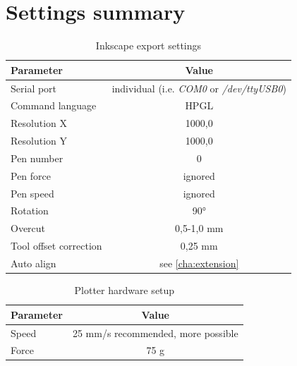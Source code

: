\newcommand{\rarr}{$\rightarrow$}

\chapter{Settings summary}
\begin{table}[htb]
	\centering
	\begin{tabular}{|l|c|}
		\hline
		\textbf{Parameter}	&	\textbf{Value}\\\hline\hline
		Serial port	&	individual (i.e. \textit{COM0} or \textit{/dev/ttyUSB0})\\\hline
		Command language	& HPGL\\\hline
		Resolution X	& 1000,0\\\hline
		Resolution Y	& 1000,0\\\hline
		Pen number		& 0\\\hline
		Pen force		& ignored\\\hline
		Pen speed		& ignored\\\hline
		Rotation		& 90°\\\hline
		Overcut			& 0,5-1,0 mm\\\hline
		Tool offset correction	& 0,25 mm\\\hline
		Auto align		& see \autoref{cha:extension}\\\hline
	\end{tabular}
	\caption{Inkscape export settings}
\end{table}

\begin{table}[htb]
	\centering
	\begin{tabular}{|l|c|}
		\hline
		\textbf{Parameter}	&	\textbf{Value}\\\hline\hline
		Speed		& 25 mm/s recommended, more possible\\\hline
		Force		& 75 g\\\hline
	\end{tabular}
	\caption{Plotter hardware setup}
\end{table}

